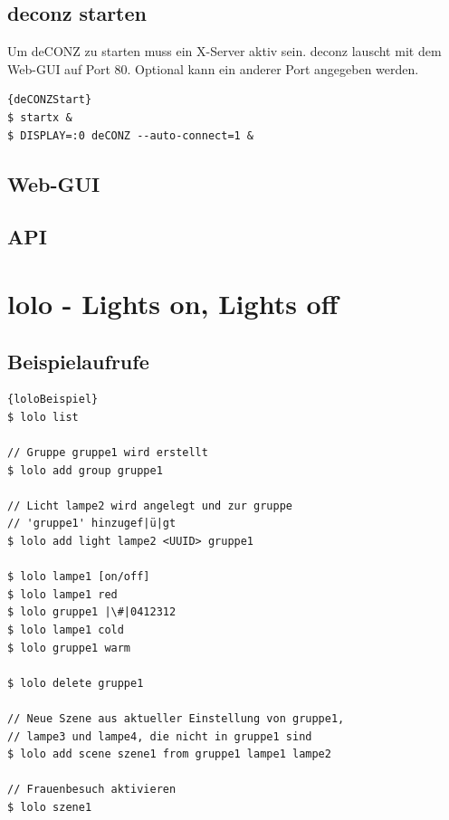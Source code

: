 \documentclass[a4paper,12pt]{article}
\begin{document}
\subsection{\acrshort{deconz} starten}

Um deCONZ zu starten muss ein X-Server aktiv sein. \acrshort{deconz} lauscht mit dem
Web-GUI auf Port 80. Optional kann ein anderer Port angegeben werden.

\begin{lstlisting}[caption=deCONZ starten]{deCONZStart}
$ startx &
$ DISPLAY=:0 deCONZ --auto-connect=1 &
\end{lstlisting}

\subsection{Web-GUI}
\subsection{API}

\newpage

\section{lolo - Lights on, Lights off}
\label{lolo}

\subsection{Beispielaufrufe}

\begin{lstlisting}[caption=lolo Beispielaufrufe]{loloBeispiel}
$ lolo list

// Gruppe gruppe1 wird erstellt
$ lolo add group gruppe1

// Licht lampe2 wird angelegt und zur gruppe
// 'gruppe1' hinzugef|ü|gt
$ lolo add light lampe2 <UUID> gruppe1

$ lolo lampe1 [on/off]
$ lolo lampe1 red
$ lolo gruppe1 |\#|0412312
$ lolo lampe1 cold
$ lolo gruppe1 warm

$ lolo delete gruppe1

// Neue Szene aus aktueller Einstellung von gruppe1,
// lampe3 und lampe4, die nicht in gruppe1 sind
$ lolo add scene szene1 from gruppe1 lampe1 lampe2

// Frauenbesuch aktivieren
$ lolo szene1
\end{lstlisting}

\newpage

\printglossary[type=\acronymtype,title=Abkürzungsverzeichnis]

\newpage

\printglossary
\end{document}
